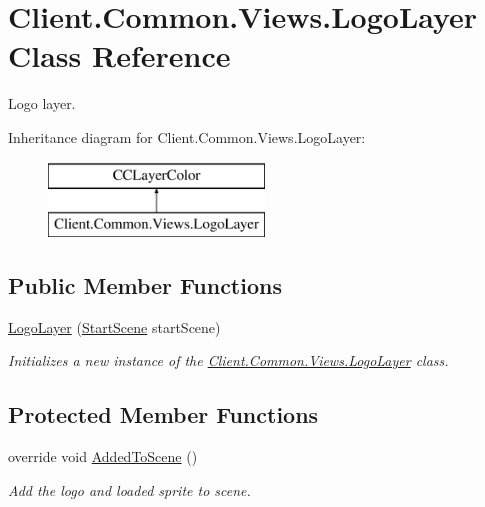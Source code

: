 \hypertarget{classClient_1_1Common_1_1Views_1_1LogoLayer}{}\section{Client.\+Common.\+Views.\+Logo\+Layer Class Reference}
\label{classClient_1_1Common_1_1Views_1_1LogoLayer}


Logo layer.  


Inheritance diagram for Client.\+Common.\+Views.\+Logo\+Layer\+:\begin{figure}[H]
\begin{center}
\leavevmode
\includegraphics[height=2.000000cm]{classClient_1_1Common_1_1Views_1_1LogoLayer}
\end{center}
\end{figure}
\subsection*{Public Member Functions}
\begin{DoxyCompactItemize}
\item 
\hyperlink{classClient_1_1Common_1_1Views_1_1LogoLayer_a0a0c2ad0ea01f8f6fd135c5259b54d89}{Logo\+Layer} (\hyperlink{classClient_1_1Common_1_1Views_1_1StartScene}{Start\+Scene} start\+Scene)
\begin{DoxyCompactList}\small\item\em Initializes a new instance of the \hyperlink{classClient_1_1Common_1_1Views_1_1LogoLayer}{Client.\+Common.\+Views.\+Logo\+Layer} class. \end{DoxyCompactList}\end{DoxyCompactItemize}
\subsection*{Protected Member Functions}
\begin{DoxyCompactItemize}
\item 
override void \hyperlink{classClient_1_1Common_1_1Views_1_1LogoLayer_ab7adc83ae509b73ddeb815f96fe26f10}{Added\+To\+Scene} ()
\begin{DoxyCompactList}\small\item\em Add the logo and loaded sprite to scene. \end{DoxyCompactList}\end{DoxyCompactItemize}


